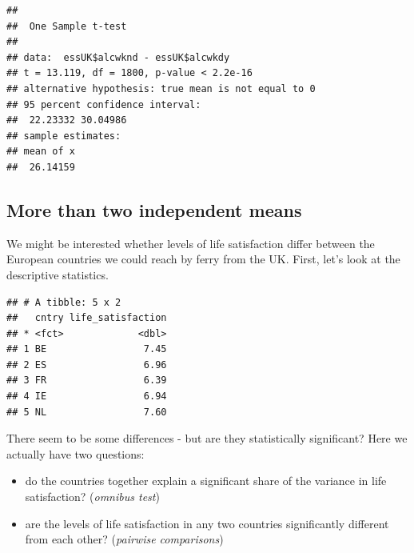 \documentclass[
]{book}
\newenvironment{Shaded}{\begin{snugshade}}{\end{snugshade}}
\newcommand{\DataTypeTok}[1]{\textcolor[rgb]{0.13,0.29,0.53}{#1}}
\newcommand{\KeywordTok}[1]{\textcolor[rgb]{0.13,0.29,0.53}{\textbf{#1}}}
\newcommand{\NormalTok}[1]{#1}
\newcommand{\OperatorTok}[1]{\textcolor[rgb]{0.81,0.36,0.00}{\textbf{#1}}}
\newcommand{\StringTok}[1]{\textcolor[rgb]{0.31,0.60,0.02}{#1}}
\providecommand{\tightlist}{%
  \setlength{\itemsep}{0pt}\setlength{\parskip}{0pt}}
\begin{document}
\begin{verbatim}
## 
## 	One Sample t-test
## 
## data:  essUK$alcwknd - essUK$alcwkdy
## t = 13.119, df = 1800, p-value < 2.2e-16
## alternative hypothesis: true mean is not equal to 0
## 95 percent confidence interval:
##  22.23332 30.04986
## sample estimates:
## mean of x 
##  26.14159
\end{verbatim}

\hypertarget{more-than-two-independent-means}{%
\subsection{More than two independent means}\label{more-than-two-independent-means}}

We might be interested whether levels of life satisfaction differ between the European countries we could reach by ferry from the UK. First, let's look at the descriptive statistics.

\begin{Shaded}
\end{Shaded}

\begin{verbatim}
## # A tibble: 5 x 2
##   cntry life_satisfaction
## * <fct>             <dbl>
## 1 BE                 7.45
## 2 ES                 6.96
## 3 FR                 6.39
## 4 IE                 6.94
## 5 NL                 7.60
\end{verbatim}

There seem to be some differences - but are they statistically significant? Here we actually have two questions:

\begin{itemize}
\tightlist
\item
  do the countries together explain a significant share of the variance in life satisfaction? (\emph{omnibus test})
\item
  are the levels of life satisfaction in any two countries significantly different from each other? (\emph{pairwise comparisons})
\end{itemize}
\end{document}
